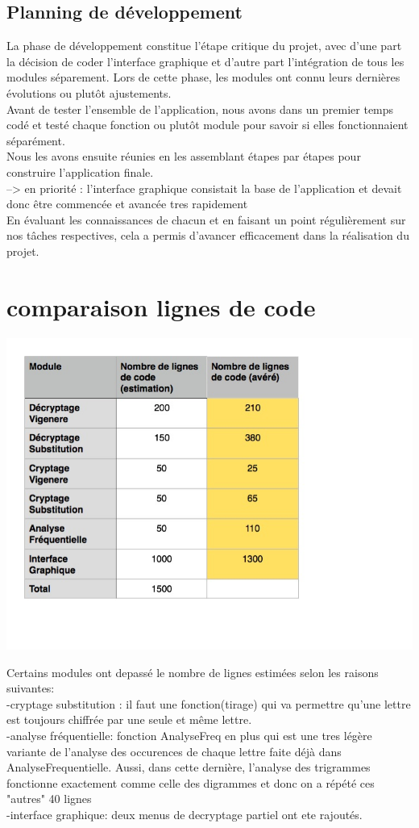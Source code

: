 \documentclass[a4]{article}
\begin{document}
		\subsection{Planning de développement}
		La phase de développement constitue l’étape critique du projet, avec d’une part la décision de coder l’interface graphique
et d’autre part l’intégration de tous les modules séparement. Lors de cette phase, les modules ont connu leurs dernières évolutions ou plutôt ajustements. \\
Avant de tester l’ensemble de l’application, nous avons dans un premier temps codé et
testé chaque fonction ou plutôt module pour savoir si elles fonctionnaient séparément. \\
Nous les avons ensuite
réunies en les assemblant étapes par étapes pour construire l’application finale.  \\
--> en priorité : l'interface graphique consistait la base de l'application et devait donc être commencée et avancée tres rapidement \\
En évaluant les connaissances de chacun et en faisant un point régulièrement sur nos tâches respectives, cela a permis 
d'avancer efficacement dans la réalisation du projet.
	\section{comparaison lignes de code}
		\begin{center}\includegraphics[scale=0.5]{preview.jpg}\end{center}
		Certains modules ont depassé le nombre de lignes estimées selon les raisons suivantes: \\
		-cryptage substitution : il faut une fonction(tirage) qui va permettre qu'une lettre est toujours chiffrée
		 par une seule et même lettre. \\
		-analyse fréquentielle: fonction AnalyseFreq en plus qui est une tres légère variante de l'analyse des occurences de 
		chaque lettre faite déjà dans AnalyseFrequentielle. Aussi, dans cette dernière, l'analyse des trigrammes fonctionne exactement
		comme celle des digrammes et donc on a répété ces "autres" 40 lignes \\
		-interface graphique: deux menus de decryptage partiel ont ete rajoutés.\\
		
\end{document}
